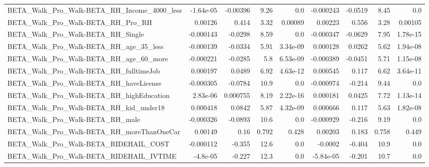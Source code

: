 \begin{tabular}{lrrrrrrrr}
BETA\_Walk\_Pro\_Walk-BETA\_RH\_Income\_4000\_less        &   -1.64e-05 &     -0.00396 &      9.26 &      0.0 &  -0.000243 &     -0.0519 &         8.45 &           0.0 \\
BETA\_Walk\_Pro\_Walk-BETA\_RH\_Pro\_RH                  &     0.00126 &        0.414 &      3.32 &  0.00089 &    0.00223 &       0.556 &         3.28 &       0.00105 \\
BETA\_Walk\_Pro\_Walk-BETA\_RH\_Single                  &   -0.000143 &      -0.0298 &      8.59 &      0.0 &  -0.000347 &     -0.0629 &         7.95 &      1.78e-15 \\
BETA\_Walk\_Pro\_Walk-BETA\_RH\_age\_35\_less             &   -0.000139 &      -0.0334 &      5.91 & 3.34e-09 &   0.000128 &      0.0262 &         5.62 &      1.94e-08 \\
BETA\_Walk\_Pro\_Walk-BETA\_RH\_age\_60\_more             &   -0.000221 &      -0.0285 &       5.8 & 6.53e-09 &  -0.000389 &     -0.0451 &         5.71 &      1.15e-08 \\
BETA\_Walk\_Pro\_Walk-BETA\_RH\_fulltimeJob             &    0.000197 &       0.0489 &      6.92 & 4.63e-12 &   0.000545 &       0.117 &         6.62 &      3.64e-11 \\
BETA\_Walk\_Pro\_Walk-BETA\_RH\_haveLicense             &   -0.000305 &      -0.0784 &      10.9 &      0.0 &  -0.000974 &      -0.214 &         9.44 &           0.0 \\
BETA\_Walk\_Pro\_Walk-BETA\_RH\_highEducation           &    2.83e-06 &     0.000755 &      8.19 & 2.22e-16 &   0.000181 &      0.0425 &         7.72 &      1.13e-14 \\
BETA\_Walk\_Pro\_Walk-BETA\_RH\_kid\_under18             &    0.000418 &       0.0842 &      5.87 & 4.32e-09 &   0.000666 &       0.117 &         5.63 &      1.82e-08 \\
BETA\_Walk\_Pro\_Walk-BETA\_RH\_male                    &   -0.000326 &      -0.0893 &      10.6 &      0.0 &  -0.000929 &      -0.216 &         9.19 &           0.0 \\
BETA\_Walk\_Pro\_Walk-BETA\_RH\_moreThanOneCar          &     0.00149 &         0.16 &     0.792 &    0.428 &    0.00203 &       0.183 &        0.758 &         0.449 \\
BETA\_Walk\_Pro\_Walk-BETA\_RIDEHAIL\_COST              &   -0.000112 &       -0.355 &      12.6 &      0.0 &    -0.0002 &      -0.404 &         10.9 &           0.0 \\
BETA\_Walk\_Pro\_Walk-BETA\_RIDEHAIL\_IVTIME            &    -4.8e-05 &       -0.227 &      12.3 &      0.0 &  -5.84e-05 &      -0.201 &         10.7 &           0.0 \\

\end{tabular}
